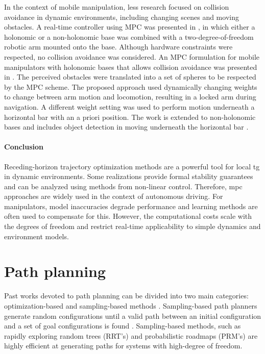In the context of mobile manipulation, less research focused on collision
avoidance in dynamic environments, including changing scenes and moving
obstacles. A real-time controller using MPC was presented in \cite{Ide2011}, in
which either a holonomic or a non-holonomic base was combined with a
two-degree-of-freedom robotic arm mounted onto the base. Although hardware
constraints were respected, no collision avoidance was considered.  An MPC
formulation for mobile manipulators with holonomic bases that allows collision
avoidance was presented in \cite{Avanzini2015}. The perceived obstacles were
translated into a set of spheres to be respected by the MPC scheme. The proposed
approach used dynamically changing weights to change between arm motion and
locomotion, resulting in a locked arm during navigation. A different weight
setting was used to perform motion underneath a horizontal bar with an a priori
position. The work is extended to non-holonomic bases and includes object
detection in moving underneath the horizontal bar \cite{Avanzini2018}. 


\paragraph{Conclusion}

Receding-horizon trajectory optimization methods are a
powerful tool for local \ac{tg} in dynamic environments.
Some realizations provide formal stability guarantees and can be analyzed
using methods from non-linear control. Therefore, \ac{mpc}
approaches are widely used in the context of autonomous
driving. For manipulators, model inaccuracies degrade
performance and learning methods are often used to
compensate for this. However, the computational costs scale
with the degrees of freedom and restrict real-time
applicability to simple dynamics and environment models.

\section{Path planning}
\label{sec:path_planning}

Past works devoted to path planning can be divided into two
main categories: optimization-based and sampling-based
methods \cite{LaValle2006,Mukadam2017}. Sampling-based path
planners generate random configurations until a valid path
between an initial configuration and a set of goal
configurations is found \cite{Karaman2011}. Sampling-based
methods, such as rapidly exploring random trees (RRT's)
\cite{Webb2013,Kleinbort2019,Kuffner2000} and probabilistic
roadmaps (PRM's) \cite{Hsu2002,Faust2017} are highly
efficient at generating paths for systems with high-degree
of freedom.

